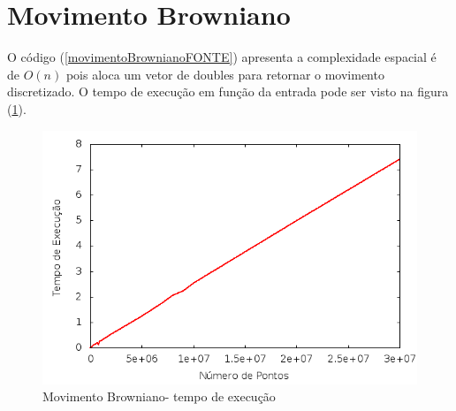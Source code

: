 \section{Movimento Browniano}
O código (\ref{movimentoBrownianoFONTE}) apresenta a complexidade espacial é de $O(n)$ pois aloca um vetor de doubles para retornar o movimento discretizado. O tempo de execução em função da entrada pode ser visto na figura (\ref{movBrownianoTempExec}).
\begin{figure}[!htb]
\centering
\begin{minipage}[b]{0.45\linewidth}
\includegraphics[width=\linewidth]{./img/AspectosNumericos/MBComplexidade.png}
\caption{Movimento Browniano- tempo de execução}
\label{movBrownianoTempExec}
\end{minipage} \hfill
\end{figure}


